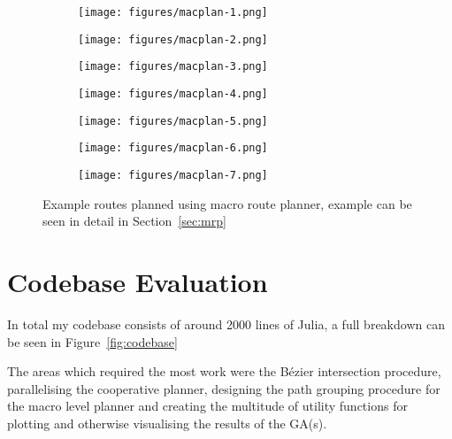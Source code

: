 \begin{figure}
  \centering
  \begin{subfigure}[b]{0.44\textwidth}
    \centering
    \texttt{[image: figures/macplan-1.png]}
    \caption{\label{subfig:macplan-1}}
  \end{subfigure}
  \begin{subfigure}[b]{0.44\textwidth}
    \centering
    \texttt{[image: figures/macplan-2.png]}
    \caption{\label{subfig:macplan-2}}
  \end{subfigure}
  \begin{subfigure}[b]{0.44\textwidth}
    \centering
    \texttt{[image: figures/macplan-3.png]}
    \caption{\label{subfig:macplan-3}}
  \end{subfigure}
  \begin{subfigure}[b]{0.44\textwidth}
    \centering
    \texttt{[image: figures/macplan-4.png]}
    \caption{\label{subfig:macplan-4}}
  \end{subfigure}
  \begin{subfigure}[b]{0.44\textwidth}
    \centering
    \texttt{[image: figures/macplan-5.png]}
    \caption{\label{subfig:macplan-5}}
  \end{subfigure}
  \begin{subfigure}[b]{0.44\textwidth}
    \centering
    \texttt{[image: figures/macplan-6.png]}
    \caption{\label{subfig:macplan-6}}
  \end{subfigure}
  \begin{subfigure}[b]{0.44\textwidth}
    \centering
    \texttt{[image: figures/macplan-7.png]}
    \caption{\label{subfig:macplan-7}}
  \end{subfigure}
  \caption{\label{fig:macro--plans} Example routes planned using macro route planner, example can be seen in detail in Section~\ref{sec:mrp} }
\end{figure}


\section{Codebase Evaluation}

In total my codebase consists of around 2000 lines of Julia, a full breakdown can be seen in Figure~\ref{fig:codebase}

The areas which required the most work were the Bézier intersection procedure, parallelising the cooperative planner, designing the path grouping procedure for the macro level planner and creating the multitude of utility functions for plotting and otherwise visualising the results of the GA(s).

